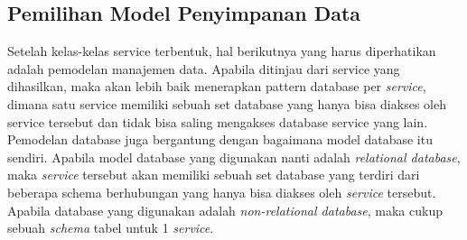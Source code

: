 \begin{adjustbox}{width=1\textwidth}
	\begin{minipage}{\linewidth}
	\end{minipage}
\end{adjustbox}

\subsection{Pemilihan Model Penyimpanan Data}
Setelah kelas-kelas service terbentuk, hal berikutnya yang harus diperhatikan adalah pemodelan manajemen data. Apabila ditinjau dari service yang dihasilkan, maka akan lebih baik menerapkan pattern database per \textit{service}, dimana satu service memiliki sebuah set database yang hanya bisa diakses oleh service tersebut dan tidak bisa saling mengakses database service yang lain.\\
Pemodelan database juga bergantung dengan bagaimana model database itu sendiri. Apabila model database yang digunakan nanti adalah \textit{relational database}, maka \textit{service} tersebut akan memiliki sebuah set database yang terdiri dari beberapa schema berhubungan yang hanya bisa diakses oleh \textit{service} tersebut. Apabila database yang digunakan adalah \textit{non-relational database}, maka cukup sebuah \textit{schema} tabel untuk 1 \textit{service}.
